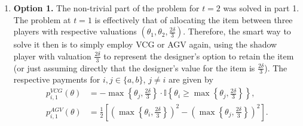 \documentclass[a4paper]{article}
\begin{document}
\begin{enumerate}
		\item \textbf{Option 1.} The non-trivial part of the problem for $t=2$ was solved in part 1. The problem at $t=1$ is effectively that of allocating the item between three players with respective valuations $(\theta_1, \theta_2, \frac{2\delta}{3})$. Therefore, the smart way to solve it then is to simply employ VCG or AGV again, using the shadow player with valuation $\frac{2\delta}{3}$ to represent the designer's option to retain the item (or just assuming directly that the designer's value for the item is $\frac{2\delta}{3}$). The respective payments for $i,j \in \{a,b\}$, $j\neq i$ are given by
		\begin{align*}
			p^{VCG}_{i,1} (\theta) &= -\max \left\{\theta_j, \frac{2\delta}{3}\right\} \cdot \mathbb{I} \left\{ \theta_i \geq \max \left\{\theta_j, \frac{2\delta}{3}\right\} \right\},
			\\
			p^{AGV}_{i,1} (\theta) &= \frac{1}{2} \left[ \left(\max \left\{\theta_i, \frac{2\delta}{3}\right\}\right)^2 - \left(\max \left\{\theta_j, \frac{2\delta}{3}\right\}\right)^2 \right].
		\end{align*}
	

\end{enumerate}
\end{document}
